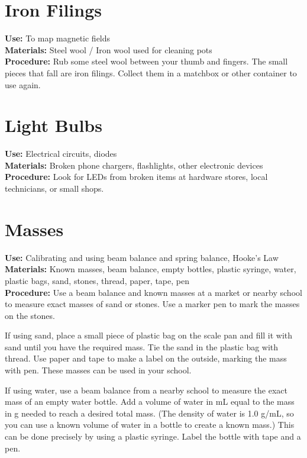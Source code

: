 \section*{Iron Filings}
\vspace{-10pt}
\textbf{Use:} To map magnetic fields\\
\textbf{Materials:} Steel wool / Iron wool used for cleaning pots\\
\textbf{Procedure:} Rub some steel wool between your thumb and fingers.  The small pieces that fall are iron filings.  Collect them in a matchbox or other container to use again.

\section*{Light Bulbs}
\vspace{-10pt}
\textbf{Use:} Electrical circuits, diodes\\
\textbf{Materials:} Broken phone chargers, flashlights, other electronic devices\\
\textbf{Procedure:} Look for LEDs from broken items at hardware stores, local technicians, or small shops. 

\section*{Masses}
\label{sec:masses}
\vspace{-10pt}
\textbf{Use:} Calibrating and using beam balance and spring balance, Hooke's Law\\
\textbf{Materials:} Known masses, beam balance, empty bottles, plastic syringe, water, plastic bags, sand, stones, thread, paper, tape, pen\\
\textbf{Procedure:} Use a beam balance and known masses at a market or nearby school to measure exact masses of sand or stones.  Use a marker pen to mark the masses on the stones. 

If using sand, place a small piece of plastic bag on the scale pan and fill it with sand until you have the required mass.  Tie the sand in the plastic bag with thread.  Use paper and tape to make a label on the outside, marking the mass with pen.  These masses can be used in your school.

If using water, use a beam balance from a nearby school to measure the exact mass of an empty water bottle. Add a volume of water in mL equal to the mass in g needed to reach a desired total mass. (The density of water is 1.0 g/mL, so you can use a known volume of water in a bottle to create a known mass.) This can be done precisely by using a plastic syringe. Label the bottle with tape and a pen.

